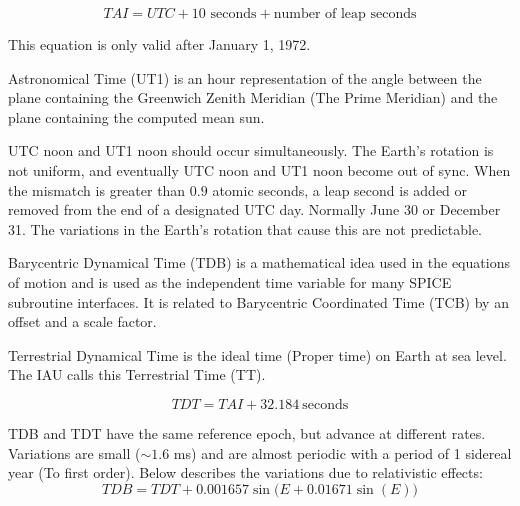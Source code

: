 \documentclass[crop=false,class=article,oneside]{standalone}
\begin{document}
            \begin{equation}
                TAI=UTC+10\textrm{ seconds}
                   +\textrm{number of leap seconds}
            \end{equation}
            \begin{remark}
                This equation is only valid
                after January 1, 1972.
            \end{remark}
            \begin{definition}
                Astronomical Time (UT1) is an hour
                representation of the angle between the plane
                containing the Greenwich Zenith Meridian
                (The Prime Meridian) and the plane containing
                the computed mean sun.
            \end{definition}
            \begin{remark}
                UTC noon and UT1 noon should occur
                simultaneously. The Earth's rotation is not
                uniform, and eventually UTC noon and UT1 noon
                become out of sync. When the mismatch is
                greater than $0.9$ atomic seconds, a leap
                second is added or removed from the end of
                a designated UTC day. Normally June 30 or
                December 31. The variations in the Earth's
                rotation that cause this are not predictable.
            \end{remark}
            \begin{definition}
                Barycentric Dynamical Time (TDB) is a
                mathematical idea used in the equations of
                motion and is used as the independent time
                variable for many SPICE subroutine interfaces.
                It is related to Barycentric Coordinated Time
                (TCB) by an offset and a scale factor.
            \end{definition}
            \begin{definition}
                Terrestrial Dynamical Time is the ideal time
                (Proper time) on Earth at sea level.
                The IAU calls this Terrestrial Time (TT).
            \end{definition}
            \begin{equation}
            TDT=TAI+32.184\ \textrm{seconds}
            \end{equation}
            \begin{remark}
            TDB and TDT have the same reference epoch, but advance at different rates. Variations are small ($\sim 1.6$ ms) and are almost periodic with a period of 1 sidereal year (To first order). Below describes the variations due to relativistic effects:
            \begin{equation}
            TDB=TDT+0.001657\sin\big(E+0.01671\sin(E)\big)
            \end{equation}
            \end{remark} 
\end{document}

